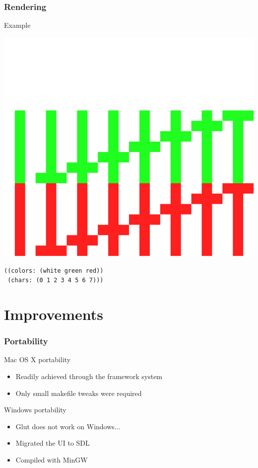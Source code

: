 \documentclass{beamer}
\newcommand{\<}[1]{\`#1}
\begin{document}
\begin{frame}[fragile]
  \frametitle{Rendering}

  \begin{block}{Example}
    \begin{center}
      \includegraphics[scale=0.2]{font-exemple}
    \end{center}
    \begin{lstlisting}[basicstyle=\footnotesize]
((colors: (white green red))
 (chars: (0 1 2 3 4 5 6 7)))
    \end{lstlisting}
  \end{block}
\end{frame}




\section{Improvements}

\begin{frame}
  \frametitle{Portability}
  \begin{block}{Mac OS X portability}
    \begin{itemize}
    \item Readily achieved through the framework system
    \item Only small makefile tweaks were required
    \end{itemize}
  \end{block}

  \begin{block}{Windows portability}
    \begin{itemize}
    \item Glut does not work on Windows...
    \item Migrated the UI to SDL
    \item Compiled with MinGW
    \end{itemize}
  \end{block}
\end{frame}
\end{document}
